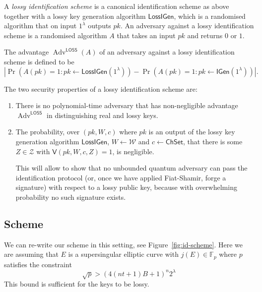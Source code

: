 \documentclass{llncs}
\newcommand{\F}{\mathbb{F}}
\DeclareMathOperator{\Adv}{Adv}
\newcommand{\IGen}{\mathsf{IGen}}
\newcommand{\VV}{\mathsf{V}}
\newcommand{\Wset}{\mathcal{W}}
\newcommand{\Zset}{\mathcal{Z}}
\newcommand{\ChSet}{\textsf{ChSet}}
\newcommand{\LossIGen}{\mathsf{LossIGen}}
\newcommand{\longversion}[1]{}
\newcommand{\shortversion}[1]{#1}
\begin{document}
A \emph{lossy identification scheme} is a canonical identification scheme as above together with a lossy key generation algorithm $\LossIGen$, which is a randomised algorithm that on input $1^\lambda$ outputs $pk$.
An adversary against a lossy identification scheme is a randomised algorithm $A$ that takes an input $pk$ and returns $0$ or $1$.
\longversion{
The advantage of an adversary against a lossy identification scheme is 
\[
   \Adv^{\textsf{LOSS}}(A) = \left|
   \Pr\left( A( pk ) = 1 : pk \leftarrow \LossIGen(1^\lambda) \right) - \Pr\left( A( pk ) = 1 : pk \leftarrow \IGen( 1^\lambda ) \right) \right|.
\]
}
\shortversion{
The advantage $\Adv^{\textsf{LOSS}}(A)$ of an adversary against a lossy identification scheme is defined to be
\[
\left|   \Pr\left( A( pk ) = 1 : pk \leftarrow \LossIGen(1^\lambda) \right) - \Pr\left( A( pk ) = 1 : pk \leftarrow \IGen( 1^\lambda ) \right) \right|.
\]
}
The two security properties of a lossy identification scheme are:
\begin{enumerate}
\item There is no polynomial-time adversary that has non-negligible advantage $\Adv^{\textsf{LOSS}}$ in distinguishing real and lossy keys.
\item The probability, over $(pk, W, c)$ where $pk$ is an output of the lossy key generation algorithm $\LossIGen$, $W \leftarrow \Wset$ and $c \leftarrow \ChSet$, that there is some $Z \in \Zset$ with $\VV( pk, W, c, Z ) = 1$, is negligible.

This will allow to show that no unbounded quantum adversary can pass the identification protocol (or, once we have applied Fiat-Shamir, forge a signature) with respect to a lossy public key, because with overwhelming probability no such signature exists.
\end{enumerate}


\subsection{Scheme}

We can re-write our scheme in this setting, see Figure~\ref{fig:id-scheme}.
Here we are assuming that $E$ is a supersingular elliptic curve with $j(E) \in \F_p$ where $p$ satisfies the constraint
\begin{equation} \label{eq:lossy-p-bound}
  \sqrt{p} > (4(nt+1)B + 1)^{n} 2^\lambda
\end{equation}
This bound is sufficient for the keys to be lossy.
\end{document}
